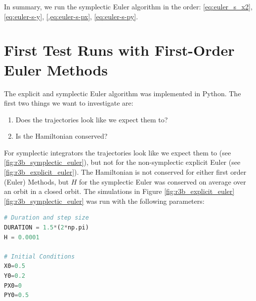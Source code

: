 In summary, we run the symplectic Euler algorithm in the order: \cref{eq:euler_s_x2}, \cref{eq:euler-s-y}, \cref{,eq:euler-s-px}, \cref{eq:euler-s-py}.

\section{First Test Runs with First-Order Euler Methods}
The explicit and symplectic Euler algorithm was implemented in Python. The first two things we want to investigate are:
\begin{enumerate}
    \item Does the trajectories look like we expect them to? 
    \item Is the Hamiltonian conserved?
\end{enumerate}
For symplectic integrators the trajectories look like we expect them to (see \ref{fig:r3b_symplectic_euler}), but not for the non-symplectic explicit Euler (see \ref{fig:r3b_explicit_euler}). The Hamiltonian is not conserved for either first order (Euler) Methods, but $H$ for the symplectic Euler was conserved on average over an orbit in a closed orbit.
The simulations in Figure \ref{fig:r3b_explicit_euler} \ref{fig:r3b_symplectic_euler} was run with the following parameters:
\begin{adjustwidth*}{0cm}{-0.4cm}
\begin{lstlisting}[language=Python,caption={Initial conditions, step size and duration for initial test run},label={lst:testrun}]
# Duration and step size
DURATION = 1.5*(2*np.pi)
H = 0.0001

# Initial Conditions
X0=0.5
Y0=0.2
PX0=0
PY0=0.5
\end{lstlisting}
\end{adjustwidth*}

